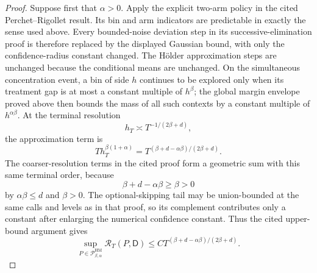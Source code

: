 \documentclass{article}
\begin{document}
\begin{proof}
Suppose first that \(\alpha>0\).  Apply the explicit two-arm policy in the cited Perchet--Rigollet result.  Its bin and arm indicators are predictable in exactly the sense used above.  Every bounded-noise deviation step in its successive-elimination proof is therefore replaced by the displayed Gaussian bound, with only the confidence-radius constant changed.  The H\"older approximation steps are unchanged because the conditional means are unchanged.  On the simultaneous concentration event, a bin of side \(h\) continues to be explored only when its treatment gap is at most a constant multiple of \(h^\beta\); the global margin envelope proved above then bounds the mass of all such contexts by a constant multiple of \(h^{\alpha\beta}\).  At the terminal resolution
\[
 h_T\asymp T^{-1/(2\beta+d)},
\]
the approximation term is
\[
 T h_T^{\beta(1+\alpha)}
 =T^{(\beta+d-\alpha\beta)/(2\beta+d)}.
\]
The coarser-resolution terms in the cited proof form a geometric sum with this same terminal order, because
\[
 \beta+d-\alpha\beta\geq\beta>0
\]
by \(\alpha\beta\leq d\) and \(\beta>0\).  The optional-skipping tail may be union-bounded at the same calls and levels as in that proof, so its complement contributes only a constant after enlarging the numerical confidence constant.  Thus the cited upper-bound argument gives
\[
 \sup_{P\in\mathcal P_{\beta,\alpha}^{\mathrm{HM}}}
 \mathcal R_T(P,\mathsf D)
 \leq C T^{(\beta+d-\alpha\beta)/(2\beta+d)}.
\]


\end{proof}
\end{document}
